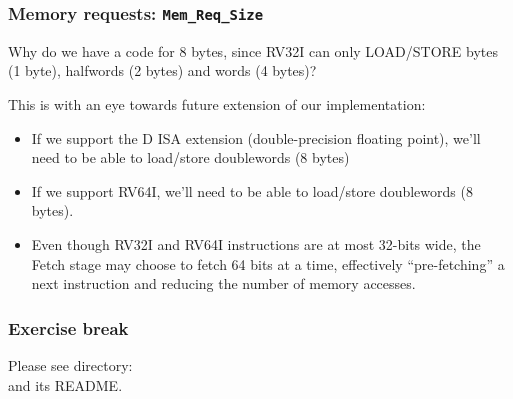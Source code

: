 \begin{frame}[fragile]
\frametitle{Memory requests: {\tt Mem\_Req\_Size}}

\footnotesize


\PAUSE{\vspace{2ex}}

Why do we have a code for 8 bytes, since RV32I can only LOAD/STORE
bytes (1 byte), halfwords (2 bytes) and words (4 bytes)?

\PAUSE{\vspace{2ex}}

This is with an eye towards future extension of our implementation:

\begin{itemize}

 \item If we support the D ISA extension (double-precision floating
       point), we'll need to be able to load/store doublewords (8 bytes)

 \item If we support RV64I, we'll need to be able to load/store doublewords (8 bytes).

 \PAUSE{\vspace{2ex}}

 \item Even though RV32I and RV64I instructions are at most 32-bits
       wide, the Fetch stage may choose to fetch 64 bits at a time,
       effectively ``pre-fetching'' a next instruction and reducing
       the number of memory accesses.

\end{itemize}

\end{frame}


\begin{frame}
\frametitle{\EmojiExercise \hmm Exercise break}

Please see directory:  \\
and its README.

\end{frame}


